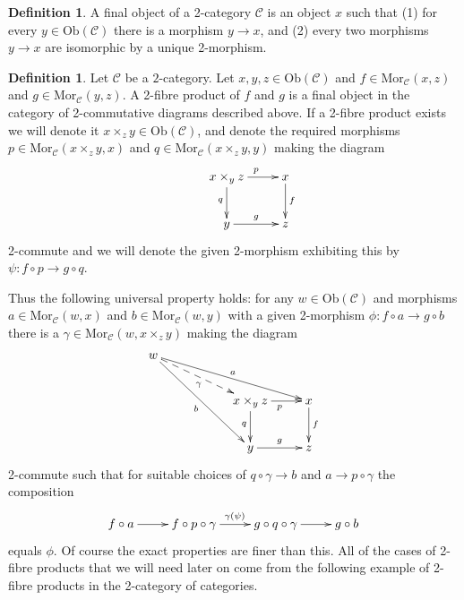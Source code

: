 \documentclass{amsart}
\theoremstyle{definition}
\newtheorem{definition}[theorem]{Definition}
\theoremstyle{remark}
\numberwithin{equation}{subsection}
\begin{document}
\begin{definition}
\label{definition-final-object-2-category}
A final object of a 2-category $\mathcal{C}$ is an object $x$ such that
(1) for every $y \in \text{Ob}(\mathcal{C})$ there is a morphism $y \to x$,
and (2) every two morphisms $y \to x$ are isomorphic by a unique 2-morphism.
\end{definition}

\begin{definition}
\label{definition-2-fibre-products}
Let $\mathcal{C}$ be a $2$-category.
Let $x,y,z\in \text{Ob}(\mathcal{C})$ and $f\in \text{Mor}_{\mathcal{C}}(x,z)$
and $g\in \text{Mor}_{\mathcal C}(y,z)$. A 2-fibre product of $f$ and $g$ is
a final object in the category of 2-commutative diagrams described above. If
a 2-fibre product exists we
will denote it $x\times_z y\in \text{Ob}(\mathcal{C})$, and denote the
required morphisms $p\in \text{Mor}_{\mathcal C}(x\times_z y,x)$ and 
$q\in \text{Mor}_{\mathcal C}(x\times_z y,y)$ making the diagram
$$
\xymatrix{
&x\times_y z \ar[r]^{p} \ar[d]_{q} & x \ar[d]^{f} \\
&y \ar[r]^{g} & z }
$$
2-commute and we will denote the given 2-morphism exhibiting this by
$\psi : f \circ p \to g \circ q$.
\end{definition}

\noindent
Thus the following universal property holds: for any
$w\in \text{Ob}(\mathcal{C})$ and morphisms 
$a \in \text{Mor}_{\mathcal C}(w,x)$ and 
$b \in \text{Mor}_{\mathcal{C}}(w,y)$ with a given 2-morphism
$\phi : f \circ a \to g\circ b$
there is a $\gamma \in \text{Mor}_{\mathcal C}(w,x\times_z y)$
making the diagram
$$
\xymatrix{
w\ar[rrrd]^a \ar@{-->}[rrd]_\gamma \ar[rrdd]_b &&\\
&&x\times_y z \ar[r]_{p} \ar[d]_{q} & x \ar[d]^{f} \\
&&y \ar[r]^{g} & z }
$$
2-commute such that for suitable choices of $q \circ \gamma \to b$
and $a \to p \circ \gamma$ the composition
$$
\xymatrix{
f \circ a \ar[r] &
f \circ p \circ \gamma \ar[r]^{\gamma(\psi)} &
g \circ q \circ \gamma \ar[r] &
g\circ b }
$$
equals $\phi$. Of course the exact properties are finer than this. All of the
cases of 2-fibre products that we will need later on come from the following
example of 2-fibre products in the 2-category of categories.
\end{document}

